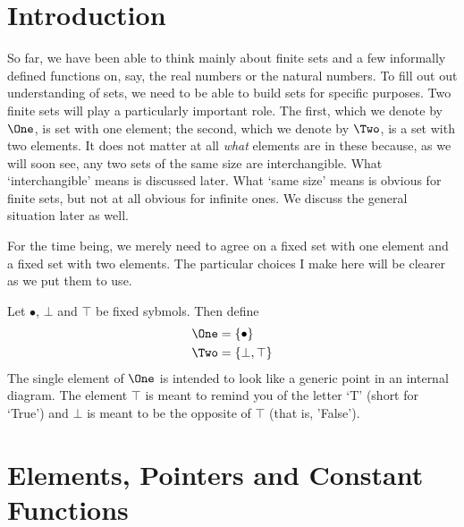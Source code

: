 \section{Introduction}

So far, we have been able to think mainly about finite sets and a few informally defined functions on, say, the real numbers or the natural numbers.
To fill out out understanding of sets, we need to be able to build sets for specific purposes.
Two finite sets will play a particularly important role.
The first, which we denote by $\One$, is  set with one element; the second, which we denote by $\Two$, is a set with two elements.
It does not matter at all \emph{what} elements are in these because, as we will soon see, any two sets of the same size are interchangible.
What `interchangible' means is discussed later.
What `same size' means is obvious for finite sets, but not at all obvious for infinite ones.
We discuss the general situation later as well.

For the time being, we merely need to agree on a fixed set with one element and a fixed set with two elements.
The particular choices I make here will be clearer as we put them to use.

\begin{defn}
	Let $\bullet$, $\bot$ and $\top$ be fixed sybmols. Then define
	\begin{align*}
		\One &= \{\bullet\}\\
		\Two &= \{\bot,\top\}
	\end{align*} 
	The single element of $\One$ is intended to look like a generic point in an internal diagram.
	The element $\top$ is meant to remind you of the letter `T' (short for `True') and $\bot$ is meant to be the opposite of $\top$ (that is, 'False').
\end{defn}


\section{Elements, Pointers and Constant Functions}

